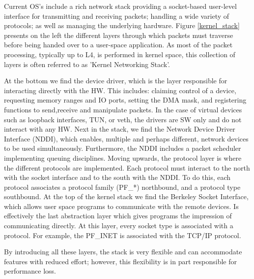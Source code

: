 \documentclass[conference]{IEEEtran}
\begin{document}
Current OS's include a rich network stack providing a socket-based user-level interface for transmitting and receiving packets; handling a wide variety of protocols; as well as managing the underlying hardware. Figure \ref{kernel_stack} presents on the left the different layers through which packets must traverse before being handed over to a user-space application. As most of the packet processing, typically up to L4, is performed in kernel space, this collection of layers is often referred to as 'Kernel Networking Stack'.

At the bottom we find the device driver, which is the layer responsible for interacting directly with the HW. This includes: claiming control of a device, requesting memory ranges and IO ports, setting the DMA mask, and registering functions to send,receive and manipulate packets. In the case of virtual devices such as loopback interfaces, TUN, or veth, the drivers are SW only and do not interact with any HW. Next in the stack, we find the Network Device Driver Interface (NDDI), which enables, multiple and perhaps different, network devices to be used simultaneously. Furthermore, the NDDI includes a packet scheduler implementing queuing disciplines. Moving upwards, the protocol layer is where the different protocols are implemented. Each protocol must interact to the north with the socket interface and to the south with the NDDI. To do this, each protocol associates a protocol family (PF\_*) northbound, and a protocol type southbound. At the top of the kernel stack we find the Berkeley Socket Interface, which allows user space programs to communicate with the remote devices. Is effectively the last abstraction layer which gives programs the impression of communicating directly. At this layer, every socket type is associated with a protocol. For example, the PF\_INET is associated with the TCP/IP protocol.

By introducing all these layers, the stack is very flexible and can accommodate features with reduced effort; however, this flexibility is in part responsible for performance loss.
\end{document}
